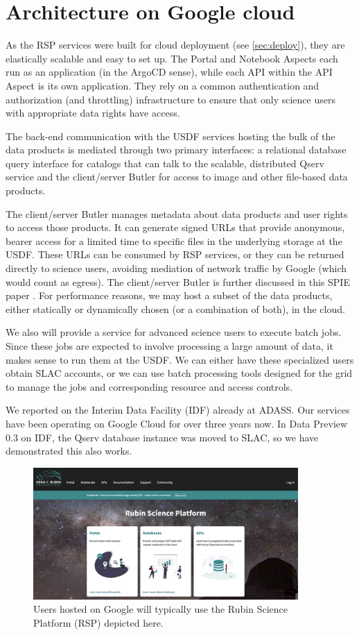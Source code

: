 \section{Architecture on Google cloud} \label{sec:google}

As the RSP services were built for cloud deployment (see \autoref{sec:deploy}), they are elastically scalable and easy to set up.
The Portal and Notebook Aspects each run as an application (in the ArgoCD sense), while each API within the API Aspect is its own application.
They rely on a common authentication and authorization (and throttling) infrastructure to ensure that only science users with appropriate data rights have access.

The back-end communication with the USDF services hosting the bulk of the data products is mediated through two primary interfaces: a relational database query interface for catalogs that can talk to the scalable, distributed Qserv service and the client/server Butler for access to image and other file-based data products.

The client/server Butler manages metadata about data products and user rights to access those products.
It can generate signed URLs that provide anonymous, bearer access for a limited time to specific files in the underlying storage at the USDF.
These URLs can be consumed by RSP services, or they can be returned directly to science users, avoiding mediation of network traffic by Google (which would count as egress).
The client/server Butler is further discussed in this SPIE paper \cite{2024SPIE13101.129Jtmp}.
For performance reasons, we may host a subset of the data products, either statically or dynamically chosen (or a combination of both), in the cloud.

We also will provide a service for advanced science users to execute batch jobs.
Since these jobs are expected to involve processing a large amount of data, it makes sense to run them at the USDF.
We can either have these specialized users obtain SLAC accounts, or we can use batch processing tools designed for the grid to manage the jobs and corresponding resource and access controls.

We reported on the Interim Data Facility (IDF) already at ADASS\cite{2021arXiv211115030O}.
Our services have been operating on Google Cloud for over three years now.
In Data Preview 0.3 on IDF, the Qserv database instance was moved to SLAC, so we have demonstrated this also works.


\begin{figure}
\begin{centering}
\includegraphics[width=0.9\textwidth]{RSP.png}
	\caption{ Users hosted on Google will typically use the Rubin Science Platform (RSP) depicted here.  \label{fig:rsp}}
\end{centering}
\end{figure}
